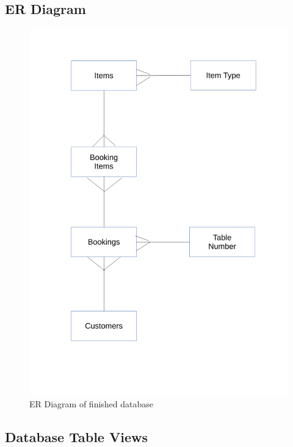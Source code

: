 \subsection{ER Diagram}
\begin{figure}[H]
    \includegraphics[width = 12cm ]{./Maintenance/images/erDiagram}
    \caption{ER Diagram of finished database} \label{fig:erDiagram}
\end{figure}

\subsection{Database Table Views}

